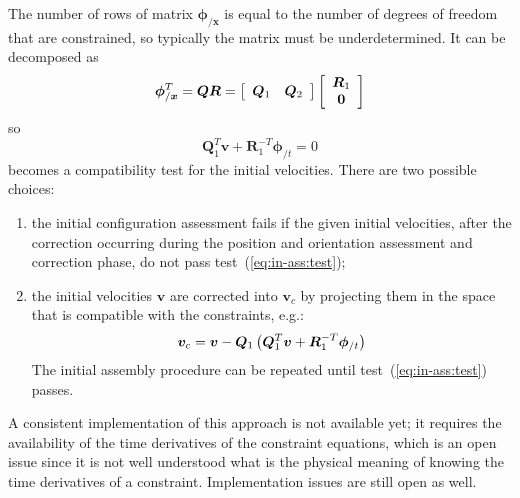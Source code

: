 \documentclass[10pt,dvips,fleqn,subeqn]{report}
\newcommand{\T}[1]{\bm{#1}}
\begin{document}
The number of rows of matrix $\T{\phi}_{/\T{x}}$ is equal to the number 
of degrees of freedom that are constrained, so typically the matrix 
must be underdetermined.
It can be decomposed as
\begin{equation}
	\T{\phi}_{/\T{x}}^T = \T{Q} \T{R}
		= \sqbr{\matr{cc}{\T{Q}_1 & \T{Q}_2}}\sqbr{\cvvect{\T{R}_1 \\ \T{0}}}
\end{equation}
so
\begin{equation}
	\T{Q}_1^T \T{v} + \T{R}_1^{-T} \T{\phi}_{/t} = 0
	\label{eq:in-ass:test}
\end{equation}
becomes a compatibility test for the initial velocities.
There are two possible choices:
\begin{enumerate}
\item the initial configuration assessment fails if the given 
initial velocities, after the correction occurring during the position 
and orientation assessment and correction phase, do not pass 
test~(\ref{eq:in-ass:test});
\item the initial velocities $\T{v}$ are corrected into $\T{v}_c$ 
by projecting them in the space that is compatible with the constraints, 
e.g.:
\begin{equation}
	\T{v}_c = \T{v} - \T{Q}_1 \plbr{\T{Q}_1^T \T{v} + \T{R}_1^{-T}\T{\phi}_{/t}}
\end{equation}
The initial assembly procedure can be repeated until 
test~(\ref{eq:in-ass:test}) passes.
\end{enumerate}
A consistent implementation of this approach is not available yet;
it requires the availability of the time derivatives 
of the constraint equations, which is an open issue since it is not
well understood what is the physical meaning of knowing 
the time derivatives of a constraint.
Implementation issues are still open as well.
\end{document}
